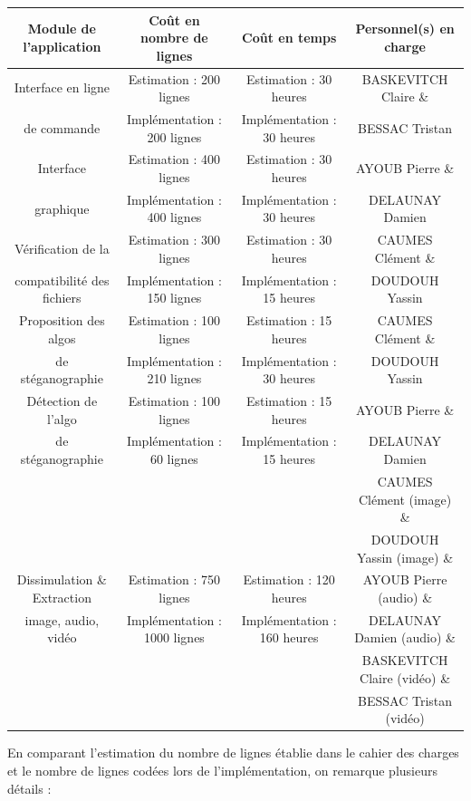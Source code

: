 \documentclass[11pt]{article}
\begin{document}
\small
\hspace{-1.5cm}
\begin{tabular}{|c|c|c|c|}
  \hline
  \textbf{Module de l'application} & \textbf{Coût en nombre de lignes} & \textbf{Coût en temps} & \textbf{Personnel(s) en charge} \\
  \hline
    Interface en ligne & Estimation : 200 lignes & Estimation : 30 heures & BASKEVITCH Claire \& \\ 
    de commande & Implémentation : 200 lignes & Implémentation : 30 heures & BESSAC Tristan \\
  \hline
  Interface & Estimation : 400 lignes & Estimation : 30 heures & AYOUB Pierre \& \\
  graphique & Implémentation : 400 lignes & Implémentation : 30 heures & DELAUNAY Damien \\
  \hline
  Vérification de la & Estimation : 300 lignes & Estimation : 30 heures & CAUMES Clément \& \\
   compatibilité des fichiers & Implémentation : 150 lignes & Implémentation : 15 heures & DOUDOUH Yassin \\
  \hline
    Proposition des algos & Estimation : 100 lignes & Estimation : 15 heures & CAUMES Clément \& \\
   de stéganographie & Implémentation : 210 lignes & Implémentation : 30 heures & DOUDOUH Yassin \\
  \hline
    Détection de l'algo & Estimation : 100 lignes & Estimation : 15 heures & AYOUB Pierre \& \\
   de stéganographie & Implémentation : 60 lignes & Implémentation : 15 heures & DELAUNAY Damien \\
  \hline
   & & & CAUMES Clément (image) \& \\
   & & &  DOUDOUH Yassin (image) \& \\
   Dissimulation \& Extraction & Estimation : 750 lignes & Estimation : 120 heures  & AYOUB Pierre (audio) \& \\
   image, audio, vidéo & Implémentation : 1000 lignes & Implémentation : 160 heures & DELAUNAY Damien (audio) \& \\
   & & & BASKEVITCH Claire (vidéo) \& \\
   & & & BESSAC Tristan (vidéo) \\
  \hline
\end{tabular}
\normalsize
\vspace{0.5cm}

En comparant l'estimation du nombre de lignes établie dans le cahier des 
charges et le nombre de lignes codées lors de l'implémentation, on remarque 
plusieurs détails : 
\end{document}
